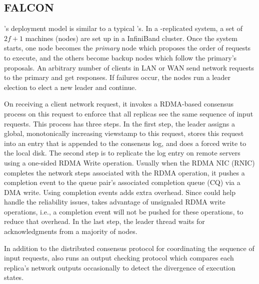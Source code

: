 \subsection{FALCON} \label{sec:falcon}

\smrsystem's deployment model is similar to a typical \smr's. In a \smrsystem-replicated 
system, a set of $2f+1$ machines (nodes) are set up in a InfiniBand cluster. Once the 
\smrsystem system starts, one node becomes the \emph{primary} node which proposes the order of 
requests to execute, and the others become backup nodes which follow the primary’s 
proposals. An arbitrary number of clients in LAN or WAN send network requests to the 
primary and get responses. If failures occur, the nodes run a leader election to elect 
a new leader and continue.

On receiving a client network request, it invokes a RDMA-based consensus process on this 
request to enforce that all replicas see the same sequence of input requests. This process 
has three steps. In the first step, the leader assigns a global, monotonically increasing 
viewstamp to this request, stores this request into an entry that is appended to the consensus 
log, and does a forced write to the local disk. The second step is to replicate the log entry 
on remote servers using a one-sided RDMA Write operation. Usually when the RDMA NIC (RNIC) 
completes the network steps associated with the RDMA operation, it pushes a completion event 
to the queue pair's associated completion queue (CQ) via a DMA write. Using completion events 
adds extra overhead. Since \paxos could help handle the reliability issues, \smrsystem takes 
advantage of unsignaled RDMA write operations, i.e., a completion event will not be pushed for 
these operations, to reduce that overhead. In the last step, the leader thread waits for 
acknowledgments from a majority of nodes.

In addition to the distributed consensus protocol for coordinating the sequence of input requests, 
\smrsystem also runs an output checking protocol which compares each replica's network outputs 
occasionally to detect the divergence of execution states.
